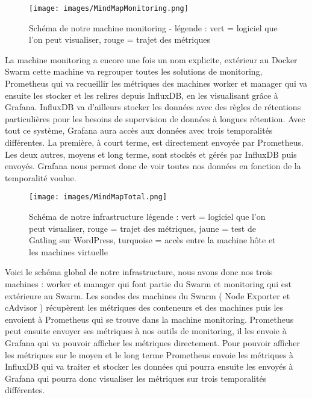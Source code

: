 \documentclass[oneside,12pt]{report}
\begin{document}
\newpage

\begin{figure}[!ht]
    \centering
    \texttt{[image: images/MindMapMonitoring.png]}
    \caption{Schéma de notre machine monitoring - légende : vert = logiciel que l'on peut visualiser, rouge = trajet des métriques}    
    \label{fig:mesh1}
\end{figure}

La machine monitoring a encore une fois un nom explicite, extérieur au Docker Swarm cette machine va regrouper toutes les solutions de monitoring, Prometheus qui va recueillir les métriques des machines worker et manager qui va ensuite les stocker et les relires depuis InfluxDB, en les visualisant grâce à Grafana. InfluxDB va d'ailleurs stocker les données avec des règles de rétentions particulières pour les besoins de supervision de données à longues rétention. Avec tout ce système, Grafana aura accès aux données avec trois temporalités différentes. La première, à court terme, est directement envoyée par Prometheus. Les deux autres, moyens et long terme, sont stockés et gérés par InfluxDB puis envoyés. Grafana nous permet donc de voir toutes nos données en fonction de la temporalité voulue.

\newpage

\begin{figure}[!ht]
    \centering
    \texttt{[image: images/MindMapTotal.png]}
    \caption{Schéma de notre infrastructure légende : vert = logiciel que l'on peut visualiser, rouge = trajet des métriques, jaune = test de Gatling sur WordPress, turquoise = accès entre la machine hôte et les machines virtuelle} 
    \label{fig:mesh1}
\end{figure}
 
Voici le schéma global de notre infrastructure, nous avons donc nos trois machines : worker et manager qui font partie du Swarm et monitoring qui est extérieure au Swarm. Les sondes des machines du Swarm ( Node Exporter et cAdvisor ) récupèrent les métriques des conteneurs et des machines puis les envoient à Prometheus qui se trouve dans la machine monitoring. Prometheus peut ensuite envoyer ses métriques à nos outils de monitoring, il les envoie à Grafana qui va pouvoir afficher les métriques directement. Pour pouvoir afficher les métriques sur le moyen et le long terme Prometheus envoie les métriques à InfluxDB qui va traiter et stocker les données qui pourra ensuite les envoyés à Grafana qui pourra donc visualiser les métriques sur trois temporalités différentes.  
\end{document}
